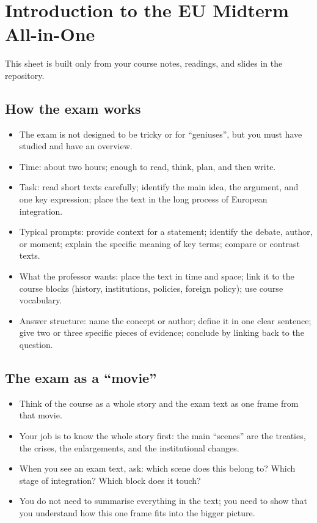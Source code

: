 \documentclass[10pt,a4paper]{article}
\begin{document}
\section*{Introduction to the EU Midterm All-in-One}

This sheet is built only from your course notes, readings, and slides in the repository.

\subsection*{How the exam works}
\begin{itemize}
\item The exam is not designed to be tricky or for “geniuses”, but you must have studied and have an overview.
\item Time: about two hours; enough to read, think, plan, and then write.
\item Task: read short texts carefully; identify the main idea, the argument, and one key expression; place the text in the long process of European integration.
\item Typical prompts: provide context for a statement; identify the debate, author, or moment; explain the specific meaning of key terms; compare or contrast texts.
\item What the professor wants: place the text in time and space; link it to the course blocks (history, institutions, policies, foreign policy); use course vocabulary.
\item Answer structure: name the concept or author; define it in one clear sentence; give two or three specific pieces of evidence; conclude by linking back to the question.
\end{itemize}

\subsection*{The exam as a ``movie''}
\begin{itemize}
\item Think of the course as a whole story and the exam text as one frame from that movie.
\item Your job is to know the whole story first: the main ``scenes'' are the treaties, the crises, the enlargements, and the institutional changes.
\item When you see an exam text, ask: which scene does this belong to? Which stage of integration? Which block does it touch?
\item You do not need to summarise everything in the text; you need to show that you understand how this one frame fits into the bigger picture.
\end{itemize}
\end{document}
